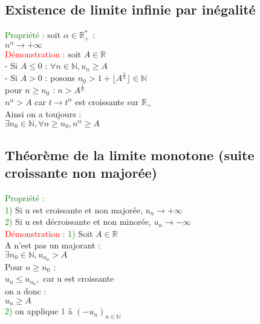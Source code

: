 \documentclass{article}
\begin{document}
	\subsection{Existence de limite infinie par inégalité}
	\textcolor{green}{Propriété :} soit $ \alpha \in \mathbb{R}^*_+$ : \\ 
	$n^\alpha \rightarrow + \infty$ \\ 
	\textcolor{red}{Démonstration :} soit $A \in \mathbb{R}$ \\ 
	- Si $A \leq 0$ : $\forall n \in \mathbb{N}, u_n \geq A$ \\ 
	- Si $A > 0$ : posons $n_0 > 1+ \lfloor A^{\frac{1}{\alpha}} \rfloor \in \mathbb{N}$ \\
	pour $n \geq n_0$ : $n > A^{\frac{1}{\alpha}}$ \\ 
	$n^{\alpha} > A$ car $t \rightarrow t^{\alpha}$ est croissante sur $\mathbb{R}_+$ \\ 
	Ainsi on a toujours : \\ 
	$\exists n_0 \in \mathbb{N}, \forall n \geq n_0, n^{\alpha} \geq A$
	     
	\subsection{Théorème de la limite monotone (suite croissante non majorée)}
	\textcolor{green}{Propriété :} \\ 
	\textcolor{green}{1)} Si u est croissante et non majorée, $u_n \rightarrow + \infty$ \\ 
	\textcolor{green}{2)} Si u est décroissante et non minorée, $u_n \rightarrow - \infty$ \\ 
	\textcolor{red}{Démonstration :} \textcolor{green}{1)} Soit $A \in \mathbb{R} $ \\ 
	A n'est pas un majorant : \\ 
	$\exists n_0 \in \mathbb{N}, u_{n_0}> A$ \\ 
	Pour $n\geq n_0$ : \\ 
	$u_n \leq u_{n_0},$ car u est croissante  \\ 
	on a donc : \\ 
	$u_n \geq A$ \\ 
	\textcolor{green}{2)} on applique \textcolor{green}{1} à $(-u_n)_{n \in \mathbb{N}}$
\end{document}
